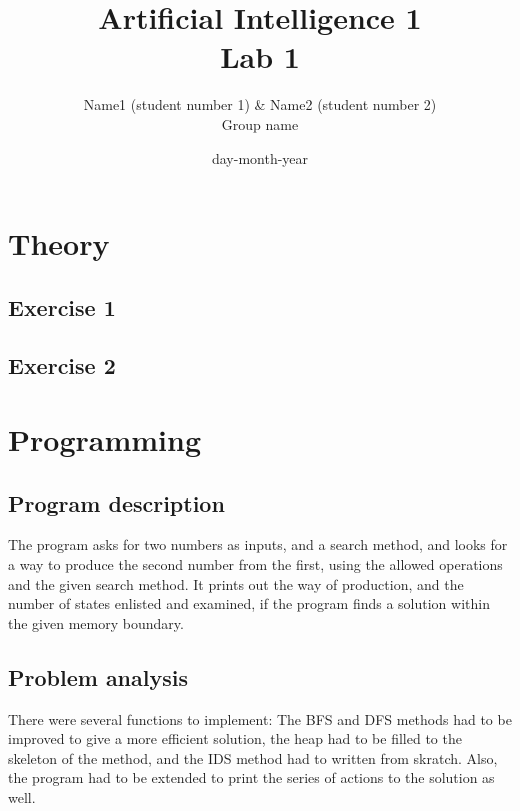 \documentclass{article}
\title{Artificial Intelligence 1 \\ Lab 1}%
\author{Name1 (student number 1) \& Name2 (student number 2) \\ Group name} %
\date{day-month-year}%
\begin{document}
\maketitle

\section*{Theory}
\subsection*{Exercise 1}

\subsection*{Exercise 2}


\section*{Programming} 
\subsection*{Program description}

The program asks for two numbers as inputs, and a search method, and looks for a way to produce the second number from the first, using the allowed operations and the given search method. It prints out the way of production, and the number of states enlisted and examined, if the program finds a solution within the given memory boundary.

\subsection*{Problem analysis}
There were several functions to implement: The BFS and DFS methods had to be improved to give a more efficient solution, the heap had to be filled to the skeleton of the method, and the IDS method had to written from skratch. Also, the program had to be extended to print the series of actions to the solution as well.  
\end{document}
